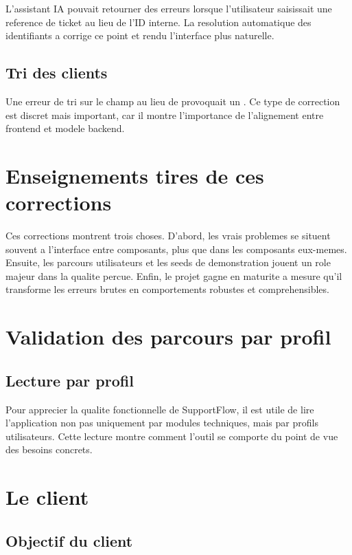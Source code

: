 L'assistant IA pouvait retourner des erreurs lorsque l'utilisateur saisissait une reference de ticket au lieu de l'ID interne. La resolution automatique des identifiants a corrige ce point et rendu l'interface plus naturelle.

\subsection{Tri des clients}

Une erreur de tri sur le champ  au lieu de  provoquait un . Ce type de correction est discret mais important, car il montre l'importance de l'alignement entre frontend et modele backend.

\section{Enseignements tires de ces corrections}

Ces corrections montrent trois choses. D'abord, les vrais problemes se situent souvent a l'interface entre composants, plus que dans les composants eux-memes. Ensuite, les parcours utilisateurs et les seeds de demonstration jouent un role majeur dans la qualite percue. Enfin, le projet gagne en maturite a mesure qu'il transforme les erreurs brutes en comportements robustes et comprehensibles.



\section{Validation des parcours par profil}

\subsection{Lecture par profil}

Pour apprecier la qualite fonctionnelle de SupportFlow, il est utile de lire l'application non pas uniquement par modules techniques, mais par profils utilisateurs. Cette lecture montre comment l'outil se comporte du point de vue des besoins concrets.

\section{Le client}

\subsection{Objectif du client}

